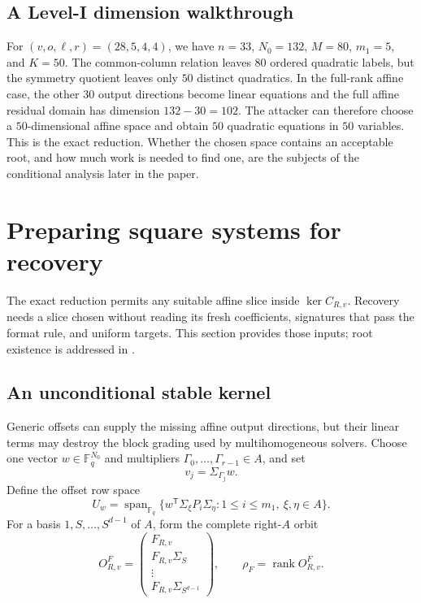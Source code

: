 \documentclass[11pt]{article}
\newcommand{\F}{\mathbb F}
\newcommand{\rank}{\operatorname{rank}}
\newcommand{\Span}{\operatorname{span}}
\newcommand{\transpose}{\mathsf T}
\begin{document}
\subsection{A Level-I dimension walkthrough}
For $(v,o,\ell,r)=(28,5,4,4)$, we have $n=33$, $N_0=132$, $M=80$,
$m_1=5$, and $K=50$.  The common-column relation leaves $80$ ordered
quadratic labels, but the symmetry quotient leaves only $50$ distinct
quadratics.  In the full-rank affine case, the other $30$ output directions
become linear equations and the full affine residual domain has dimension
$132-30=102$.  The attacker can therefore choose a $50$-dimensional affine
space and obtain $50$ quadratic equations in $50$ variables.  This is the
exact reduction.  Whether the chosen space contains an acceptable root, and
how much work is needed to find one, are the subjects of the conditional
analysis later in the paper.

\section{Preparing square systems for recovery}
\label{sec:stable-rejection}
\label{sec:sq-preparing}

The exact reduction permits any suitable affine slice inside
$\ker C_{R,v}$.  Recovery needs a slice chosen without reading its fresh
coefficients, signatures that pass the format rule, and uniform targets.  This
section provides those inputs; root existence is addressed in
.

\subsection{An unconditional stable kernel}
Generic offsets can supply the missing affine output directions, but their
linear terms may destroy the block grading used by multihomogeneous solvers.
Choose one vector $w\in\F_q^{N_0}$ and multipliers
$\Gamma_0,\ldots,\Gamma_{r-1}\in A$, and set
\begin{equation}
  v_j=\Sigma_{\Gamma_j}w.                            \label{eq:structured-offsets}
\end{equation}
Define the offset row space
\begin{equation}
 U_w=\Span_{\F_q}\{w^\transpose\Sigma_\xi P_i\Sigma_\eta:
     1\le i\le m_1,\ \xi,\eta\in A\}.              \label{eq:Uw}
\end{equation}
For a basis $1,S,\ldots,S^{d-1}$ of $A$, form the complete right-$A$ orbit
\begin{equation}
 O^F_{R,v}=
 \begin{pmatrix}
  F_{R,v}\\F_{R,v}\Sigma_S\\\vdots\\F_{R,v}\Sigma_{S^{d-1}}
 \end{pmatrix},
 \qquad \rho_F=\rank O^F_{R,v}.                    \label{eq:orbit-matrix}
\end{equation}
\end{document}
